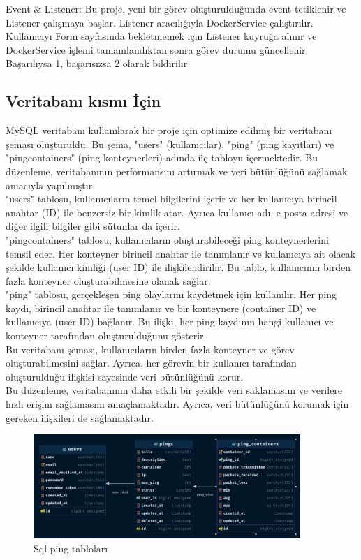 Event \& Listener: Bu proje, yeni bir görev oluşturulduğunda event tetiklenir ve Listener çalışmaya başlar. Listener aracılığıyla DockerService çalıştırılır. Kullanıcıyı Form sayfasında bekletmemek için Listener kuyruğa alınır ve DockerService işlemi tamamlandıktan sonra görev durumu güncellenir. Başarılıysa 1, başarısızsa 2 olarak bildirilir
 \subsection {Veritabanı kısmı İçin }
 MySQL veritabanı kullanılarak bir proje için optimize edilmiş bir veritabanı şeması oluşturuldu. Bu şema, "users" (kullanıcılar), "ping" (ping kayıtları) ve "pingcontainers" (ping konteynerleri) adında üç tabloyu içermektedir. Bu düzenleme, veritabanının performansını artırmak ve veri bütünlüğünü sağlamak amacıyla yapılmıştır.\\
"users" tablosu, kullanıcıların temel bilgilerini içerir ve her kullanıcıya birincil anahtar (ID) ile benzersiz bir kimlik atar. Ayrıca kullanıcı adı, e-posta adresi ve diğer ilgili bilgiler gibi sütunlar da içerir.\\
"pingcontainers" tablosu, kullanıcıların oluşturabileceği ping konteynerlerini temsil eder. Her konteyner birincil anahtar ile tanımlanır ve kullanıcıya ait olacak şekilde kullanıcı kimliği (user ID) ile ilişkilendirilir. Bu tablo, kullanıcının birden fazla konteyner oluşturabilmesine olanak sağlar.\\
"ping" tablosu, gerçekleşen ping olaylarını kaydetmek için kullanılır. Her ping kaydı, birincil anahtar ile tanımlanır ve bir konteynere (container ID) ve kullanıcıya (user ID) bağlanır. Bu ilişki, her ping kaydının hangi kullanıcı ve konteyner tarafından oluşturulduğunu gösterir.\\
Bu veritabanı şeması, kullanıcıların birden fazla konteyner ve görev oluşturabilmesini sağlar. Ayrıca, her görevin bir kullanıcı tarafından oluşturulduğu ilişkisi sayesinde veri bütünlüğünü korur.\\
Bu düzenleme, veritabanının daha etkili bir şekilde veri saklamasını ve verilere hızlı erişim sağlamasını amaçlamaktadır. Ayrıca, veri bütünlüğünü korumak için gereken ilişkileri de sağlamaktadır.\\
 \begin{figure}[]
    \centering
    \includegraphics[width=0.9\textwidth]{images/sql.jpg}
    \caption{Sql ping tabloları}
    \label{fig:resim_etiketi}
  \end{figure}



